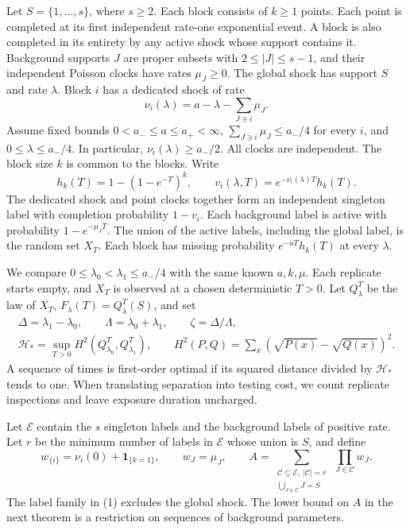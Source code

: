 \documentclass[11pt]{article}
\begin{document}
Let \(S=\{1,\ldots,s\}\), where \(s\ge2\). Each block consists of \(k\ge1\) points. Each point is completed at its first independent rate-one exponential event. A block is also completed in its entirety by any active shock whose support contains it. Background supports \(J\) are proper subsets with \(2\le |J|\le s-1\), and their independent Poisson clocks have rates \(\mu_J\ge0\). The global shock has support \(S\) and rate \(\lambda\). Block \(i\) has a dedicated shock of rate \[
\nu_i(\lambda)=a-\lambda-\sum_{J\ni i}\mu_J .
\] Assume fixed bounds \(0<a_-\le a\le a_+<\infty\), \(\sum_{J\ni i}\mu_J\le a_-/4\) for every \(i\), and \(0\le\lambda\le a_-/4\). In particular, \(\nu_i(\lambda)\ge a_-/2\). All clocks are independent. The block size \(k\) is common to the blocks. Write \[
h_k(T)=1-(1-e^{-T})^k,\qquad
v_i(\lambda,T)=e^{-\nu_i(\lambda)T}h_k(T).
\] The dedicated shock and point clocks together form an independent singleton label with completion probability \(1-v_i\). Each background label is active with probability \(1-e^{-\mu_JT}\). The union of the active labels, including the global label, is the random set \(X_T\). Each block has missing probability \(e^{-aT}h_k(T)\) at every \(\lambda\).

We compare \(0\le\lambda_0<\lambda_1\le a_-/4\) with the same known \(a,k,\mu\). Each replicate starts empty, and \(X_T\) is observed at a chosen deterministic \(T>0\). Let \(Q_\lambda^T\) be the law of \(X_T\), \(F_\lambda(T)=Q_\lambda^T(S)\), and set \[
\begin{gathered}
\Delta=\lambda_1-\lambda_0,\qquad \Lambda=\lambda_0+\lambda_1,\qquad
\zeta=\Delta/\Lambda,\\
\mathcal H_*=\sup_{T>0}H^2(Q_{\lambda_0}^T,Q_{\lambda_1}^T),\qquad
H^2(P,Q)=\sum_x(\sqrt{P(x)}-\sqrt{Q(x)})^2.
\end{gathered}
\] A sequence of times is first-order optimal if its squared distance divided by \(\mathcal H_*\) tends to one. When translating separation into testing cost, we count replicate inspections and leave exposure duration uncharged.

Let \(\mathcal E\) contain the \(s\) singleton labels and the background labels of positive rate. Let \(r\) be the minimum number of labels in \(\mathcal E\) whose union is \(S\), and define \[
w_{\{i\}}=\nu_i(0)+\mathbf 1_{\{k=1\}},\qquad w_J=\mu_J,\qquad
A=\sum_{\substack{\mathcal C\subseteq\mathcal E,\ |\mathcal C|=r\\
                 \bigcup_{J\in\mathcal C}J=S}}\ \prod_{J\in\mathcal C}w_J .
\tag{1}
\] The label family in (1) excludes the global shock. The lower bound on \(A\) in the next theorem is a restriction on sequences of background parameters.
\end{document}
